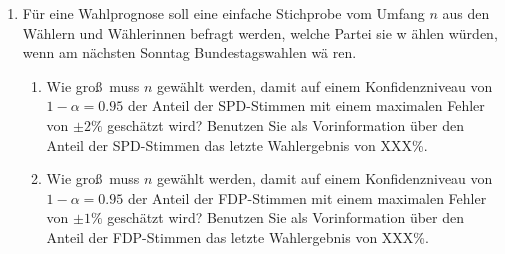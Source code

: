 \begin{enumerate}
\item F\"{u}r eine Wahlprognose soll eine einfache Stichprobe vom Umfang $n$
aus den W\"{a}hlern und W\"{a}hlerinnen befragt werden, welche Partei sie w%
\"{a}hlen w\"{u}rden, wenn am n\"{a}chsten Sonntag Bundestagswahlen w\"{a}%
ren.
\begin{enumerate}
\item Wie gro\ss\ muss $n$ gew\"{a}hlt werden, damit auf einem
Konfidenzniveau von $1-\alpha =0.95$ der Anteil der SPD-Stimmen mit einem
maximalen Fehler von $\pm 2\%$ gesch\"{a}tzt wird? Benutzen Sie als
Vorinformation \"{u}ber den Anteil der SPD-Stimmen das letzte Wahlergebnis
von XXX\%.
\item Wie gro\ss\ muss $n$ gew\"{a}hlt werden, damit auf einem
Konfidenzniveau von $1-\alpha =0.95$ der Anteil der FDP-Stimmen mit einem
maximalen Fehler von $\pm 1\%$ gesch\"{a}tzt wird? Benutzen Sie als
Vorinformation \"{u}ber den Anteil der FDP-Stimmen das letzte Wahlergebnis
von XXX\%.
\end{enumerate}
\end{enumerate}
	